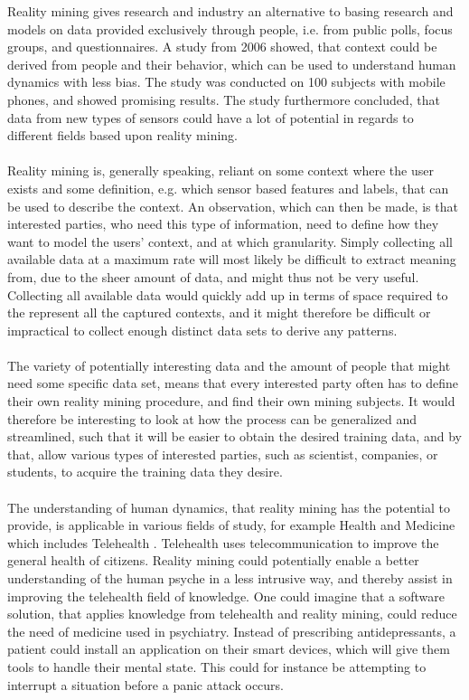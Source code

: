 Reality mining gives research and industry an alternative to basing research and models on data provided exclusively through people, i.e. from public polls, focus groups, and questionnaires. A study from 2006 \parencite{eagle2006_reality_mining_definition} showed, that context could be derived from people and their behavior, which can be used to understand human dynamics with less bias. The study was conducted on 100 subjects with mobile phones, and showed promising results. The study furthermore concluded, that data from new types of sensors could have a lot of potential in regards to different fields based upon reality mining. 
\\\\
Reality mining is, generally speaking, reliant on some context where the user exists and some definition, e.g. which sensor based features and labels, that can be used to describe the context. An observation, which can then be made, is that interested parties, who need this type of information, need to define how they want to model the users' context, and at which granularity. Simply collecting all available data at a maximum rate will most likely be difficult to extract meaning from, due to the sheer amount of data, and might thus not be very useful. Collecting all available data would quickly add up in terms of space required to the represent all the captured contexts, and it might therefore be difficult or impractical to collect enough distinct data sets to derive any patterns.
\\\\
The variety of potentially interesting data and the amount of people that might need some specific data set, means that every interested party often has to define their own reality mining procedure, and find their own mining subjects. It would therefore be interesting to look at how the process can be generalized and streamlined, such that it will be easier to obtain the desired training data, and by that, allow various types of interested parties, such as scientist, companies, or students, to acquire the training data they desire.
\\\\
The understanding of human dynamics, that reality mining has the potential to provide, is applicable in various fields of study, for example Health and Medicine \parencite{pentland2009_reality_mining_health_medicine} which includes Telehealth \parencite{telehealth_aau}. Telehealth uses telecommunication to improve the general health of citizens. Reality mining could potentially enable a better understanding of the human psyche in a less intrusive way, and thereby assist in improving the telehealth field of knowledge. One could imagine that a software solution, that applies knowledge from telehealth and reality mining, could reduce the need of medicine used in psychiatry. Instead of prescribing antidepressants, a patient could install an application on their smart devices, which will give them tools to handle their mental state. This could for instance be attempting to interrupt a situation before a panic attack occurs.
